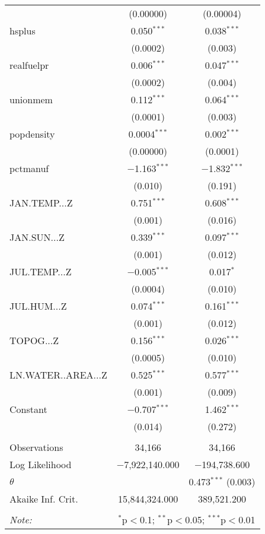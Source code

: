 \begin{table}[!htbp]
\begin{tabular}{@{\extracolsep{5pt}}lcc}
  & (0.00000) & (0.00004) \\ 
  hsplus & 0.050$^{***}$ & 0.038$^{***}$ \\ 
  & (0.0002) & (0.003) \\ 
  realfuelpr & 0.006$^{***}$ & 0.047$^{***}$ \\ 
  & (0.0002) & (0.004) \\ 
  unionmem & 0.112$^{***}$ & 0.064$^{***}$ \\ 
  & (0.0001) & (0.003) \\ 
  popdensity & 0.0004$^{***}$ & 0.002$^{***}$ \\ 
  & (0.00000) & (0.0001) \\ 
  pctmanuf & $-$1.163$^{***}$ & $-$1.832$^{***}$ \\ 
  & (0.010) & (0.191) \\ 
  JAN.TEMP...Z & 0.751$^{***}$ & 0.608$^{***}$ \\ 
  & (0.001) & (0.016) \\ 
  JAN.SUN...Z & 0.339$^{***}$ & 0.097$^{***}$ \\ 
  & (0.001) & (0.012) \\ 
  JUL.TEMP...Z & $-$0.005$^{***}$ & 0.017$^{*}$ \\ 
  & (0.0004) & (0.010) \\ 
  JUL.HUM...Z & 0.074$^{***}$ & 0.161$^{***}$ \\ 
  & (0.001) & (0.012) \\ 
  TOPOG...Z & 0.156$^{***}$ & 0.026$^{***}$ \\ 
  & (0.0005) & (0.010) \\ 
  LN.WATER..AREA...Z & 0.525$^{***}$ & 0.577$^{***}$ \\ 
  & (0.001) & (0.009) \\ 
  Constant & $-$0.707$^{***}$ & 1.462$^{***}$ \\ 
  & (0.014) & (0.272) \\ 
 \hline \\[-1.8ex] 
Observations & 34,166 & 34,166 \\ 
Log Likelihood & $-$7,922,140.000 & $-$194,738.600 \\ 
$\theta$ &  & 0.473$^{***}$  (0.003) \\ 
Akaike Inf. Crit. & 15,844,324.000 & 389,521.200 \\ 
\hline 
\hline \\[-1.8ex] 
\textit{Note:}  & \multicolumn{2}{r}{$^{*}$p$<$0.1; $^{**}$p$<$0.05; $^{***}$p$<$0.01} \\ 
\end{tabular} 
\end{table} 
